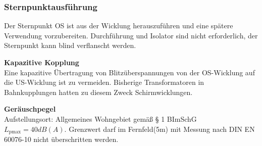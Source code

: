 \subsubsection*{Sternpunktausführung}
Der Sternpunkt OS ist aus der Wicklung herauszuführen und eine spätere Verwendung vorzubereiten. Durchführung und Isolator sind nicht erforderlich, der Sternpunkt kann blind verflanscht werden. 

\textbf{Kapazitive Kopplung}\\
Eine kapazitive Übertragung von Blitzüberspannungen von der OS-Wicklung auf die US-Wicklung ist zu vermeiden. Bisherige Transformatoren in Bahnkupplungen hatten zu diesem Zweck Schirmwicklungen. 
 
\textbf{Geräuschpegel}\\
Aufstellungsort: Allgemeines Wohngebiet gemäß § 1 BImSchG  $L_\mathrm{pmax}=40 dB(A)$.
Grenzwert darf im Fernfeld(5m) mit Messung nach DIN EN 60076-10\cite*{DINEN6007610.10:2001} nicht überschritten werden.
